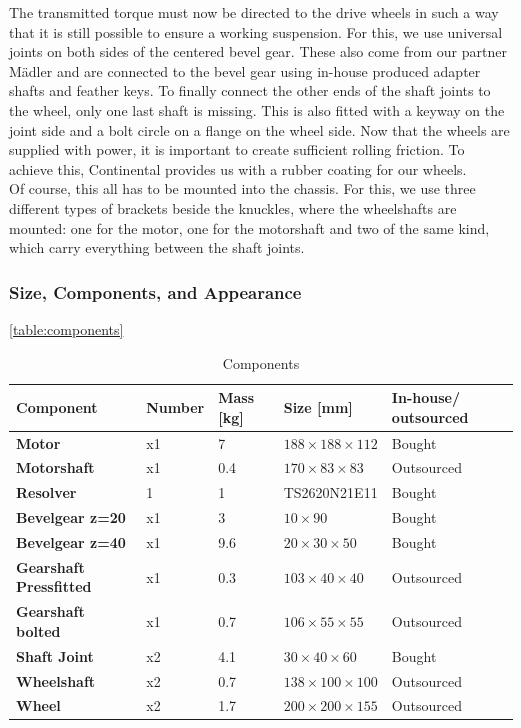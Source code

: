 The transmitted torque must now be directed to the drive wheels in such a way that it is still possible to ensure a working suspension. For this, we use universal joints on both sides of the centered bevel gear. These also come from our partner Mädler and are connected to the bevel gear using in-house produced adapter shafts and feather keys. To finally connect the other ends of the shaft joints to the wheel, only one last shaft is missing. This is also fitted with a keyway on the joint side and a bolt circle on a flange on the wheel side. Now that the wheels are supplied with power, it is important to create sufficient rolling friction. To achieve this, Continental provides us with a rubber coating for our wheels. \\
Of course, this all has to be mounted into the chassis. For this, we use three different types of brackets beside the knuckles, where the wheelshafts are mounted: one for the motor, one for the motorshaft and two of the same kind, which carry everything between the shaft joints.

\subsubsection{Size, Components, and Appearance}

\autoref{table:components}
\begin{table}[ht]
\centering
\begin{adjustbox}{width=\textwidth}
\begin{tabular}{|>{\bfseries}m{2.5cm}|m{1.4cm}|m{1.7cm}|m{2.9cm}|m{2.2cm}|}
\hline
Component & Number & Mass [kg] & Size [mm] &  In-house/ outsourced \\
\hline
Motor & x1 & 7 & \(188 \times 188 \times 112\) &   Bought \\
Motorshaft & x1 & 0.4 & \(170 \times 83\times 83\) &Outsourced \\
Resolver & 1 & 1 & TS2620N21E11 &  Bought \\
Bevelgear z=20 & x1 & 3 & \(10 \times 90\) &  Bought \\
Bevelgear z=40 & x1 & 9.6 & \(20 \times 30 \times 50\) &Bought \\
Gearshaft Pressfitted & x1 & 0.3 & \(103 \times 40 \times 40\) & Outsourced \\
Gearshaft bolted & x1 & 0.7 & \(106 \times 55 \times 55\) &Outsourced \\
Shaft Joint & x2 & 4.1 & \(30 \times 40 \times 60\) &  Bought \\
Wheelshaft & x2 & 0.7 & \(138 \times 100 \times 100\) &   Outsourced \\
Wheel & x2 & 1.7 & \(200 \times 200 \times 155\) &  Outsourced \\
\hline
\end{tabular}
\end{adjustbox}
\caption{Components}
\label{table:components}
\end{table}

